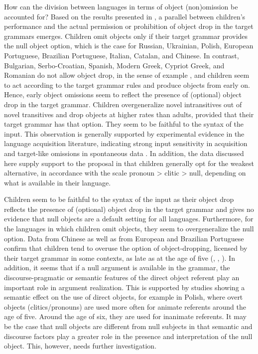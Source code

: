 \documentclass[output=paper,modfonts,newtxmath,hidelinks,]{langscibook}
\begin{document}
How can the division between languages in terms of object (non)omission be accounted for? Based on the results presented in , a parallel between children’s performance and the actual permission or prohibition of object drop in the target grammars emerges. Children omit objects only if their target grammar provides the null object option, which is the case for Russian, Ukrainian, Polish, European Portuguese, Brazilian Portuguese, Italian, Catalan, and Chinese. In contrast, Bulgarian, Serbo-Croatian, Spanish, Modern Greek, Cypriot Greek, and Romanian do not allow object drop, in the sense of example , and children seem to act according to the target grammar rules and produce objects from early on. Hence, early object omissions seem to reflect the presence of (optional) object drop in the target grammar. Children overgeneralize novel intransitives out of novel transitives and drop objects at higher rates than adults, provided that their target grammar has that option. They seem to be faithful to the syntax of the input. This observation is generally supported by experimental evidence in the language acquisition literature, indicating strong input sensitivity in acquisition and target-like omissions in spontaneous data \citep{Ingham1993}. In addition, the data discussed here supply support to the proposal in \citet{Varlokosta-etal2016} that children generally opt for the weakest alternative, in accordance with the scale pronoun > clitic > null, depending on what is available in their language.

Children seem to be faithful to the syntax of the input as their object drop reflects the presence of (optional) object drop in the target grammar and gives no evidence that null objects are a default setting for all languages. Furthermore, for the languages in which children omit objects, they seem to overgeneralize the null option. Data from Chinese as well as from European and Brazilian Portuguese confirm that children tend to overuse the option of object-dropping, licensed by their target grammar in some contexts, as late as at the age of five (\citealt{Wang-etal1992}, \citealt{Costa-etal2012}, \citealt{Lopes2009}). In addition, it seems that if a null argument is available in the grammar, the discourse-pragmatic or semantic features of the direct object referent play an important role in argument realization. This is supported by studies showing a semantic effect on the use of direct objects, for example in Polish, where overt objects (clitics/pronouns) are used more often for animate referents around the age of five. Around the age of six, they are used for inanimate referents. It may be the case that null objects are different from null subjects in that semantic and discourse factors play a greater role in the presence and interpretation of the null object. This, however, needs further investigation.
\end{document}
